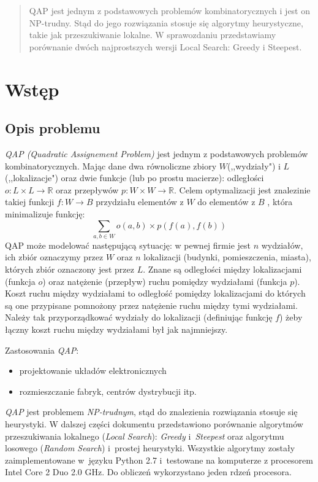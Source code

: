 \documentclass{article}
\begin{document}


\begin{abstract}
QAP jest jednym z podstawowych problemów kombinatorycznych i jest on NP-trudny. Stąd do jego rozwiązania stosuje się algorytmy heurystyczne, takie jak przeszukiwanie lokalne. W sprawozdaniu przedstawiamy porównanie dwóch najprostszych wersji Local Search: Greedy i Steepest.
\end{abstract}


\section{Wstęp}
	\subsection{Opis problemu}
	\emph{QAP (Quadratic Assignement Problem)} jest jednym z podstawowych problemów kombinatorycznych. Mając dane dwa równoliczne zbiory $W$(,,wydziały") i $L$(,,lokalizacje") oraz dwie funkcje (lub po prostu macierze): odległości $o:  L \times L \rightarrow \mathbb{R} $ oraz przepływów $p: W \times W \rightarrow \mathbb{R} $. Celem optymalizacji jest znalezinie takiej funkcji $ f: W \rightarrow B $  przydziału elementów z $W$ do elementów z $B$ , która minimalizuje funkcję:
	$$\sum_{a,b \in W}o(a,b)\times p(f(a),f(b))$$
	QAP może modelować następującą sytuację: w pewnej firmie jest $n$ wydziałów, ich zbiór oznaczymy przez $W$ oraz $n$ lokalizacji (budynki, pomieszczenia, miasta), których zbiór oznaczony jest przez $L$. Znane są odległości między lokalizacjami (funkcja $o$) oraz natężenie (przepływ) ruchu pomiędzy wydziałami (funkcja $p$). Koszt ruchu między wydziałami to odległość pomiędzy lokalizacjami do których są one przypisane pomnożony przez natężenie ruchu między tymi wydziałami. Należy tak przyporządkować wydziały do lokalizacji (definiując funkcję $f$) żeby łączny koszt ruchu między wydziałami był jak najmniejszy.

	Zastosowania \emph{QAP}:
	\begin{itemize}
		\item{projektowanie układów elektronicznych}
		\item{rozmieszczanie fabryk, centrów dystrybucji itp.}
	\end{itemize}
	
	\emph{QAP} jest problemem \emph{NP-trudnym}, stąd do znalezienia rozwiązania stosuje się heurystyki. W dalszej części dokumentu przedstawiono porównanie algorytmów przeszukiwania lokalnego (\emph{Local Search}): \emph{Greedy} i~\emph{Steepest} oraz algorytmu losowego (\emph{Random Search}) i~prostej heurystyki. Wszystkie algorytmy zostały zaimplementowane w~języku Python 2.7 i~testowane na komputerze z procesorem Intel Core 2 Duo 2.0 GHz. Do obliczeń wykorzystano jeden rdzeń procesora.
\end{document}
